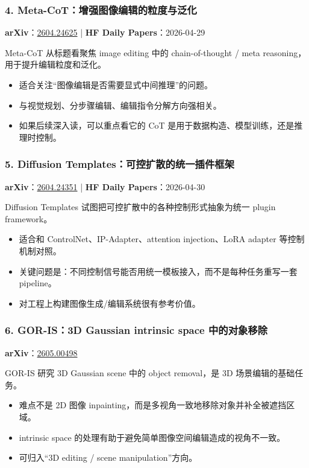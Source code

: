 \subsubsection{4. Meta-CoT：增强图像编辑的粒度与泛化}

\textbf{arXiv}：\href{https://arxiv.org/abs/2604.24625}{2604.24625} | \textbf{HF Daily Papers}：2026-04-29

Meta-CoT 从标题看聚焦 image editing 中的 chain-of-thought / meta reasoning，用于提升编辑粒度和泛化。

\begin{itemize}[leftmargin=1.5em]
  \item 适合关注“图像编辑是否需要显式中间推理”的问题。
  \item 与视觉规划、分步骤编辑、编辑指令分解方向强相关。
  \item 如果后续深入读，可以重点看它的 CoT 是用于数据构造、模型训练，还是推理时控制。
\end{itemize}

\subsubsection{5. Diffusion Templates：可控扩散的统一插件框架}

\textbf{arXiv}：\href{https://arxiv.org/abs/2604.24351}{2604.24351} | \textbf{HF Daily Papers}：2026-04-30

Diffusion Templates 试图把可控扩散中的各种控制形式抽象为统一 plugin framework。

\begin{itemize}[leftmargin=1.5em]
  \item 适合和 ControlNet、IP-Adapter、attention injection、LoRA adapter 等控制机制对照。
  \item 关键问题是：不同控制信号能否用统一模板接入，而不是每种任务重写一套 pipeline。
  \item 对工程上构建图像生成/编辑系统很有参考价值。
\end{itemize}

\subsubsection{6. GOR-IS：3D Gaussian intrinsic space 中的对象移除}

\textbf{arXiv}：\href{https://arxiv.org/abs/2605.00498}{2605.00498}

GOR-IS 研究 3D Gaussian scene 中的 object removal，是 3D 场景编辑的基础任务。

\begin{itemize}[leftmargin=1.5em]
  \item 难点不是 2D 图像 inpainting，而是多视角一致地移除对象并补全被遮挡区域。
  \item intrinsic space 的处理有助于避免简单图像空间编辑造成的视角不一致。
  \item 可归入“3D editing / scene manipulation”方向。
\end{itemize}

